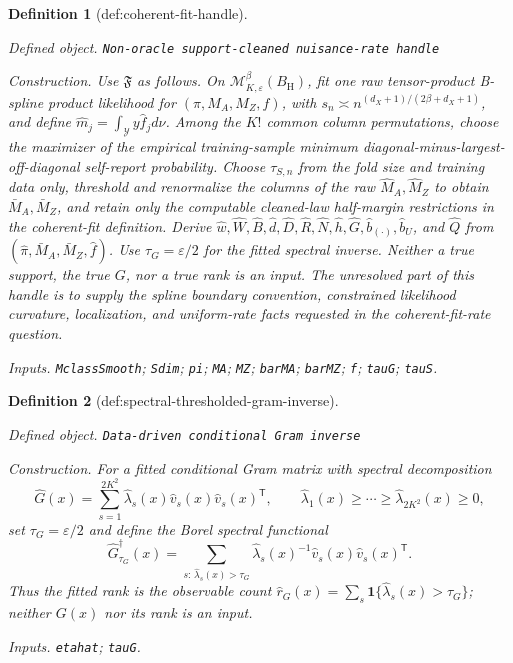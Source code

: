 \documentclass{article}
\newtheorem{definition}{Definition}
\begin{document}
\begin{definition}[def:coherent-fit-handle]\label{def:coherent-fit-handle}
\par\smallskip\noindent\emph{Defined object.} \texttt{Non-\allowbreak{}oracle support-\allowbreak{}cleaned nuisance-\allowbreak{}rate handle}
\par\smallskip\noindent\emph{Construction.} Use \(\mathfrak F\) as follows.  On \(\mathcal M^{\beta}_{K,\varepsilon}(B_{\mathrm H})\), fit one raw tensor-product B-spline product likelihood for \((\pi,M_A,M_Z,f)\), with \(s_n\asymp n^{(d_X+1)/(2\beta+d_X+1)}\), and define \(\widehat m_j=\int_{\mathcal Y}y\widehat f_jd\nu\).  Among the \(K!\) common column permutations, choose the maximizer of the empirical training-sample minimum diagonal-minus-largest-off-diagonal self-report probability.  Choose \(\tau_{S,n}\) from the fold size and training data only, threshold and renormalize the columns of the raw \(\widehat M_A,\widehat M_Z\) to obtain \(\bar M_A,\bar M_Z\), and retain only the computable cleaned-law half-margin restrictions in the coherent-fit definition.  Derive \(\widehat w,\widehat W,\widehat B,\widehat d,\widehat D,\widehat R,\widehat N,\widehat h,\widehat G,\widehat b_{(\cdot)},\widehat b_U\), and \(\widehat Q\) from \((\widehat\pi,\bar M_A,\bar M_Z,\widehat f)\).  Use \(\tau_G=\varepsilon/2\) for the fitted spectral inverse.  Neither a true support, the true \(G\), nor a true rank is an input.  The unresolved part of this handle is to supply the spline boundary convention, constrained likelihood curvature, localization, and uniform-rate facts requested in the coherent-fit-rate question.
\par\smallskip\noindent\emph{Inputs.} \texttt{MclassSmooth}; \texttt{Sdim}; \texttt{pi}; \texttt{MA}; \texttt{MZ}; \texttt{barMA}; \texttt{barMZ}; \texttt{f}; \texttt{tauG}; \texttt{tauS}.
\end{definition}

\begin{definition}[def:spectral-thresholded-gram-inverse]\label{def:spectral-thresholded-gram-inverse}
\par\smallskip\noindent\emph{Defined object.} \texttt{Data-\allowbreak{}driven conditional Gram inverse}
\par\smallskip\noindent\emph{Construction.} For a fitted conditional Gram matrix with spectral decomposition
\[
 \widehat G(x)=\sum_{s=1}^{2K^2}\widehat\lambda_s(x)
 \widehat v_s(x)\widehat v_s(x)^{\mathsf T},
 \qquad \widehat\lambda_1(x)\geq\cdots\geq\widehat\lambda_{2K^2}(x)\geq0,
\]
set \(\tau_G=\varepsilon/2\) and define the Borel spectral functional
\[
 \widehat G_{\tau_G}^{\dagger}(x)
 =\sum_{s:\,\widehat\lambda_s(x)>\tau_G}
 \widehat\lambda_s(x)^{-1}
 \widehat v_s(x)\widehat v_s(x)^{\mathsf T}.
\]
Thus the fitted rank is the observable count \(\widehat r_G(x)=\sum_s\mathbf 1\{\widehat\lambda_s(x)>\tau_G\}\); neither \(G(x)\) nor its rank is an input.
\par\smallskip\noindent\emph{Inputs.} \texttt{etahat}; \texttt{tauG}.
\end{definition}
\end{document}
